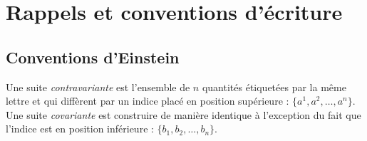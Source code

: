 \chapter{Rappels et conventions d'\'{e}criture}

\section{Conventions d'Einstein}

Une suite \emph{contravariante} est l'ensemble de $n$ quantit\'{e}s \'{e}tiquet\'{e}es par la m\^{e}me lettre et qui diff\`{e}rent par un indice plac\'{e} en position sup\'{e}rieure : $\{a^{1},a^{2},\dots,a^{n}\}$. Une suite \emph{covariante} est construire de mani\`{e}re identique \`{a} l'exception du fait que l'indice est en position inf\'{e}rieure : $\{b_{1},b_{2},\dots,b_{n}\}$.
